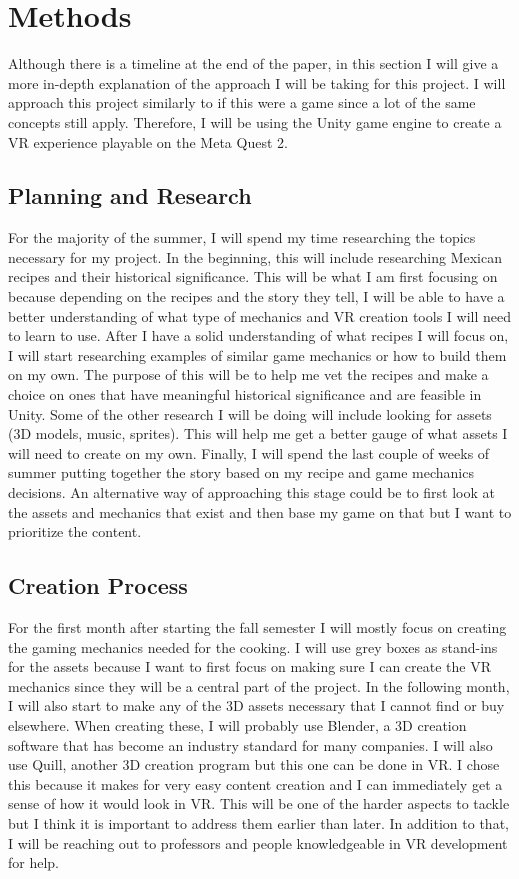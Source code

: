 \documentclass[11pt,twocolumn]{article}
\begin{document}
\section{Methods}
Although there is a timeline at the end of the paper, in this section I will give a more in-depth explanation of the approach I will be taking for this project. I will approach this project similarly to if this were a game since a lot of the same concepts still apply. Therefore, I will be using the Unity game engine to create a VR experience playable on the Meta Quest 2. 


\subsection{Planning and Research} 
For the majority of the summer, I will spend my time researching the topics necessary for my project. In the beginning, this will include researching Mexican recipes and their historical significance. This will be what I am first focusing on because depending on the recipes and the story they tell, I will be able to have a better understanding of what type of mechanics and VR creation tools I will need to learn to use. After I have a solid understanding of what recipes I will focus on, I will start researching examples of similar game mechanics or how to build them on my own. The purpose of this will be to help me vet the recipes and make a choice on ones that have meaningful historical significance and are feasible in Unity. Some of the other research I will be doing will include looking for assets (3D models, music, sprites). This will help me get a better gauge of what assets I will need to create on my own. Finally, I will spend the last couple of weeks of summer putting together the story based on my recipe and game mechanics decisions. An alternative way of approaching this stage could be to first look at the assets and mechanics that exist and then base my game on that but I want to prioritize the content.
 
\subsection{Creation Process}
For the first month after starting the fall semester I will mostly focus on creating the gaming mechanics needed for the cooking. I will use grey boxes as stand-ins for the assets because I want to first focus on making sure I can create the VR mechanics since they will be a central part of the project. In the following month, I will also start to make any of the 3D assets necessary that I cannot find or buy elsewhere. When creating these, I will probably use Blender, a 3D creation software that has become an industry standard for many companies. I will also use Quill, another 3D creation program but this one can be done in VR. I chose this because it makes for very easy content creation and I can immediately get a sense of how it would look in VR. This will be one of the harder aspects to tackle but I think it is important to address them earlier than later. In addition to that, I will be reaching out to professors and people knowledgeable in VR development for help. 
\end{document}
